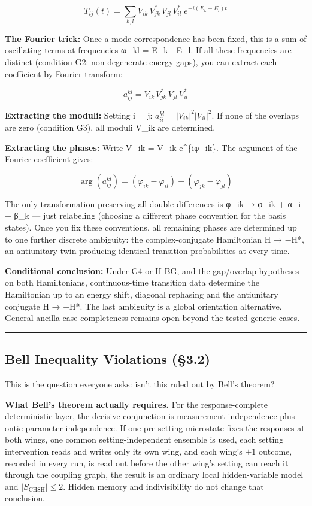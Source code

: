 \documentclass[
]{article}
\begin{document}
\[T_{ij}(t) = \sum_{k,l} V_{ik}\, V_{jk}^*\, V_{jl}\, V_{il}^*\; e^{-i(E_k - E_l)t}\]

\textbf{The Fourier trick:} Once a mode correspondence has been fixed,
this is a sum of oscillating terms at frequencies ω\_kl = E\_k - E\_l.
If all these frequencies are distinct (condition G2: non-degenerate
energy gaps), you can extract each coefficient by Fourier transform:

\[a_{ij}^{kl} = V_{ik}\, V_{jk}^*\, V_{jl}\, V_{il}^*\]

\textbf{Extracting the moduli:} Setting i = j:
\(a_{ii}^{kl} = |V_{ik}|^2 |V_{il}|^2\). If none of the overlaps are
zero (condition G3), all moduli \textbar V\_ik\textbar{} are determined.

\textbf{Extracting the phases:} Write V\_ik = \textbar V\_ik\textbar{}
e\^{}\{iφ\_ik\}. The argument of the Fourier coefficient gives:

\[\arg(a_{ij}^{kl}) = (\varphi_{ik} - \varphi_{il}) - (\varphi_{jk} - \varphi_{jl})\]

The only transformation preserving all double differences is φ\_ik →
φ\_ik + α\_i + β\_k --- just relabeling (choosing a different phase
convention for the basis states). Once you fix these conventions, all
remaining phases are determined up to one further discrete ambiguity:
the complex-conjugate Hamiltonian H → −H*, an antiunitary twin producing
identical transition probabilities at every time.

\textbf{Conditional conclusion:} Under G4 or H-BG, and the gap/overlap
hypotheses on both Hamiltonians, continuous-time transition data
determine the Hamiltonian up to an energy shift, diagonal rephasing and
the antiunitary conjugate H → −H*. The last ambiguity is a global
orientation alternative. General ancilla-case completeness remains open
beyond the tested generic cases.

\begin{center}\rule{0.5\linewidth}{0.5pt}\end{center}

\hypertarget{bell-inequality-violations-3.2}{%
\subsection{Bell Inequality Violations
(§3.2)}\label{bell-inequality-violations-3.2}}

This is the question everyone asks: isn't this ruled out by Bell's
theorem?

\textbf{What Bell's theorem actually requires.} For the
response-complete deterministic layer, the decisive conjunction is
measurement independence plus ontic parameter independence. If one
pre-setting microstate fixes the responses at both wings, one common
setting-independent ensemble is used, each setting intervention reads
and writes only its own wing, and each wing's \(\pm1\) outcome, recorded
in every run, is read out before the other wing's setting can reach it
through the coupling graph, the result is an ordinary local
hidden-variable model and \(|S_{\mathrm{CHSH}}|\le2\). Hidden memory and
indivisibility do not change that conclusion.
\end{document}
